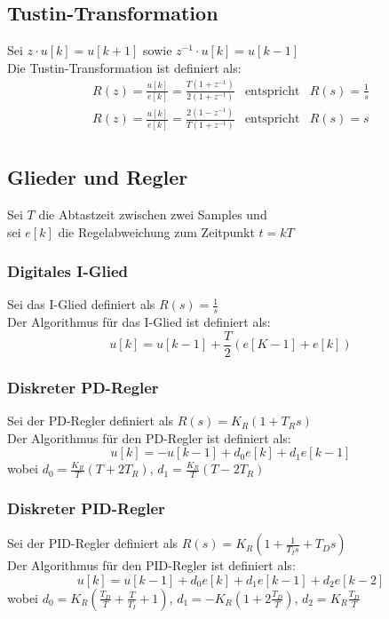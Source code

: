 \documentclass[10pt,a4paper]{article}
\renewcommand{\arraystretch}{1.5}
\newcommand{\tab}[1][1]{\hspace*{#1cm}}
\begin{document}
\subsection{Tustin-Transformation}
Sei $z ⋅ u[k] = u[k + 1]$ sowie $z^{-1} ⋅ u[k] = u[k-1]$ \\
Die Tustin-Transformation ist definiert als:
\renewcommand{\arraystretch}{2}
$$
	\begin{array}{lll}
		R(z) = \frac{u[k]}{e[k]} = \frac{T(1+z^{-1})}{2(1 + z^{-1})} & \text{entspricht} & R(s) = \frac 1 s \\
		R(z) = \frac{u[k]}{e[k]} = \frac{2(1-z^{-1})}{T(1 + z^{-1})} & \text{entspricht} & R(s) = s \\	
	\end{array}
$$
\renewcommand{\arraystretch}{1.5}
\subsection{Glieder und Regler}
Sei $T$ die Abtastzeit zwischen zwei Samples und \\
sei $e[k]$ die Regelabweichung zum Zeitpunkt $t = kT$ \\

\subsubsection{Digitales I-Glied}
Sei das I-Glied definiert als $R(s) = \frac 1 s$ \\
Der Algorithmus für das I-Glied ist definiert als:
$$
u[k] = u[k-1] + \frac T 2 (e[K-1] + e[k])
$$

\subsubsection{Diskreter PD-Regler}
Sei der PD-Regler definiert als $R(s) = K_R(1 + T_R s)$ \\
Der Algorithmus für den PD-Regler ist definiert als:
$$
	u[k] = -u[k-1] + d_0e[k] + d_1e[k-1]
$$
wobei \tab $d_0 = \frac{K_R}{T}(T + 2T_R)$, \tab $d_1 = \frac{K_R}{T}(T - 2T_R)$

\subsubsection{Diskreter PID-Regler}
Sei der PID-Regler definiert als $R(s) = K_R(1 + \frac{1}{T_I s} + T_D s)$ \\
Der Algorithmus für den PID-Regler ist definiert als:
$$
	u[k] = u[k-1] + d_0e[k] + d_1e[k-1] + d_2e[k-2]
$$
wobei \tab $d_0 = K_R(\frac{T_D}{T} + \frac{T}{T_I} + 1)$, \tab $d_1 = -K_R(1 + 2\frac{T_D}{T})$, \tab $d_2 = K_R \frac{T_D}{T}$
\end{document}
